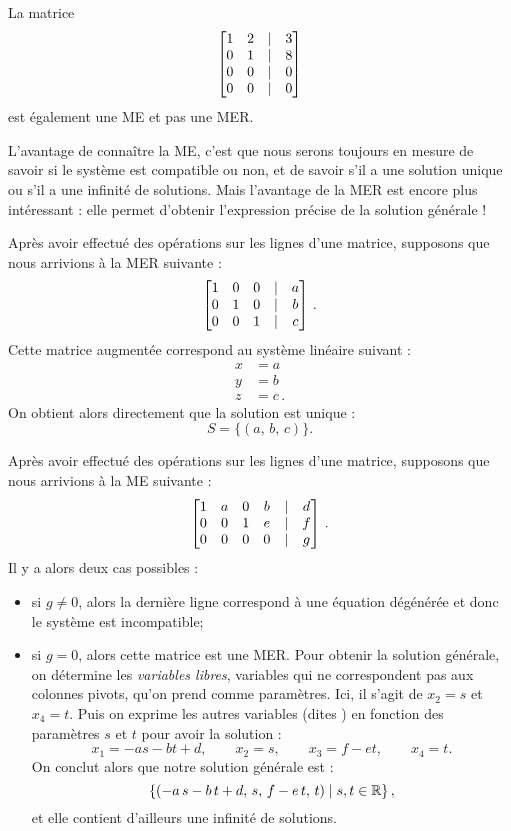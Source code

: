 \begin{myexample} La matrice
$$
\left[ \begin{matrix} 1 & 2 & | & 3\\
0 & 1 & | & 8 \\
0 & 0 & | & 0 \\
0 & 0 & | & 0 \end{matrix} \right]
$$
est également une ME et pas une MER. \end{myexample}

L'avantage de connaître la ME, c'est que nous serons toujours en mesure de savoir si le système est compatible ou non, et de savoir s'il a une solution unique ou s'il a une infinité de solutions. Mais l'avantage de la MER est encore plus intéressant : elle permet  d'obtenir l'expression précise de la solution g\'en\'erale !



\begin{myexample} \label{ex:uniquesol} Après avoir effectué des op\'erations sur les lignes d'une matrice, supposons que nous arrivions à la MER suivante :
$$
\left[ \begin{matrix} 1 & 0 & 0 &|& a\\
0 & 1 & 0 & | & b\\
0 & 0 & 1 & | & c \end{matrix} \right]\,.
$$
Cette matrice augmentée correspond au système linéaire suivant :
\begin{align*}
  x &= a\\
  y &=b\\
  z &= c \,.
\end{align*}  
On obtient alors directement que la solution est unique :
$$
S = \big\{ (a,\, b,\, c) \big\}.
$$
\end{myexample}

\begin{myexample}\label{ex:inconsis}  Après avoir effectué des op\'erations sur les lignes d'une matrice, supposons que nous arrivions à la ME suivante :
$$
\left[ \begin{matrix} 1 & a & 0 & b & | & d\\
0 & 0 & 1 & e &|& f\\
0 & 0 & 0 & 0 &|& g
 \end{matrix} \right]\,.
$$
Il y a alors deux cas possibles :  
\begin{itemize}
	\item si $g \neq 0$, alors la dernière ligne correspond à une équation dégénérée et donc le système
est incompatible;
	\item si $g = 0$, alors cette matrice est une MER. Pour obtenir la solution générale, on d\'etermine les \emph{variables libres}, variables qui ne correspondent pas aux colonnes pivots, qu'on prend comme param\`etres. Ici, il s'agit de $x_2 = s$ et $x_4 = t$. Puis on exprime les autres variables (dites ) en fonction des param\`etres $s$ et $t$ pour avoir la solution :
$$
x_1 = -as-bt+d, \qquad x_2 = s, \qquad x_3 = f-et, \qquad x_4 = t.
$$
On conclut alors que notre solution générale est :
$$
\{ ( -a\,s-b\,t+d,\, s,\, f-e\,t,\, t) \mid s,t\in\mathbb{R}\}\,,
$$
et elle contient d'ailleurs une infinité de solutions.
\end{itemize}
\end{myexample}


